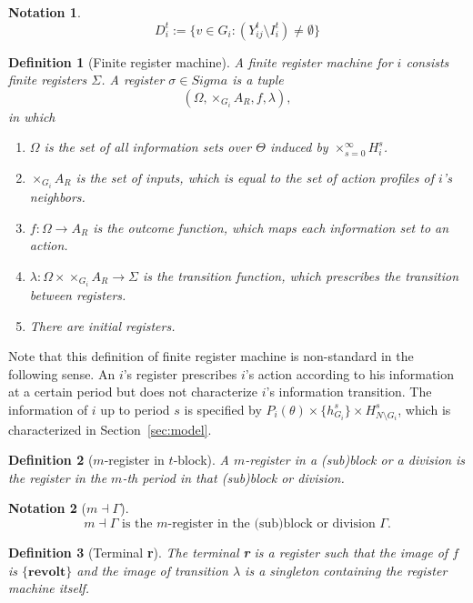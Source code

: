 \documentclass[12pt,letter]{article}
\newtheorem{definition}{Definition}[section]
\theoremstyle{definition}
\theoremstyle{definition}
\newtheorem{notation}{Notation}[section]
\theoremstyle{remark}
\theoremstyle{claim}
\begin{document}
\begin{notation}
\[D^t_{i}:= \{v\in G_i: (Y^t_{ij}\setminus I^t_i)\neq \emptyset\}\]
\end{notation}




\begin{definition}[Finite register machine]
A finite register machine for $i$ consists finite registers $\Sigma$. A register $\sigma\in Sigma$ is a tuple \[(\Omega, \times_{G_i}A_R,f,\lambda),\] in which 
\begin{enumerate}
\item $\Omega$ is the set of all information sets over $\Theta$ induced by $\times^{\infty}_{s=0}H^s_i$. 
\item $\times_{G_i}A_R$ is the set of inputs, which is equal to the set of action profiles of $i$'s neighbors.
\item $f:\Omega\rightarrow A_{R}$ is the outcome function, which maps each information set to an action.
\item $\lambda: \Omega\times \times_{G_i}A_R \rightarrow \Sigma$ is the transition function, which prescribes the transition between registers.
\item There are initial registers. 
\end{enumerate}
\end{definition}

Note that this definition of finite register machine is non-standard in the following sense. An $i$'s register prescribes $i$'s action according to his information at a certain period but does not characterize $i$'s information transition. The information of $i$ up to period $s$ is specified by $P_i(\theta)\times \{h^s_{G_i}\}\times H^s_{N\setminus G_i}$, which is characterized in Section~\ref{sec:model}. 

\begin{definition}[$m$-register in $t$-block]
A $m$-register in a (sub)block or a division is the register in the $m$-th period in that (sub)block or division. 
\end{definition}

\begin{notation}[$m\dashv\Gamma$]
\[\text{$m\dashv\Gamma$ is the $m$-register in the (sub)block or division $\Gamma$.}\]
\end{notation}

\begin{definition}[Terminal \textbf{r}]
The terminal \textbf{r} is a register such that the image of $f$ is $\{\textbf{revolt}\}$ and the image of transition $\lambda$ is a singleton containing the register machine itself. 
\end{definition}
\end{document}
